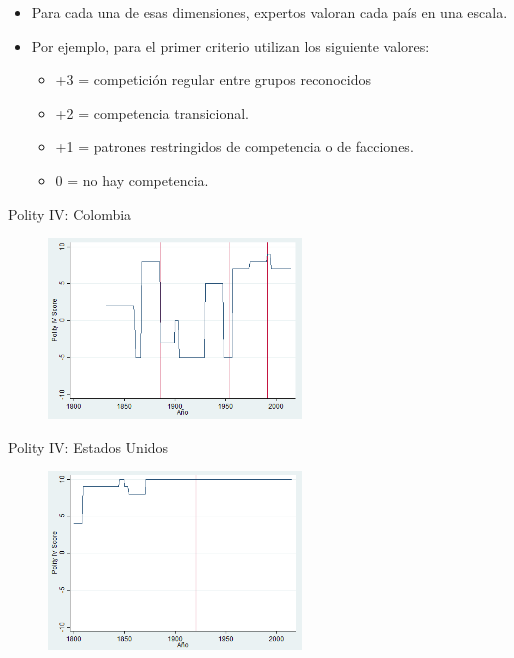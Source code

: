 \documentclass[xcolor=dvipsnames]{beamer}
\begin{document}
\begin{frame}
\begin{itemize}
\justifying
\item Para cada una de esas dimensiones, expertos valoran cada país en una escala.
\item Por ejemplo, para el primer criterio utilizan los siguiente valores: \begin{itemize}
\item +3 = competición regular entre grupos reconocidos
\item +2 = competencia transicional.
\item +1 = patrones restringidos de competencia o de facciones.
\item 0 = no hay competencia.
\end{itemize}
\end{itemize}
\end{frame}

\begin{frame}{Polity IV: Colombia}
\begin{figure}[H]
	\centering  
	\caption{ } 
	\includegraphics[width = 0.6\textwidth]{./cap1}
\end{figure}
\end{frame}

\begin{frame}{Polity IV: Estados Unidos}
	\begin{figure}[H]
		\centering  
		\caption{ } 
		\includegraphics[width = 0.6\textwidth]{./cap2}
	\end{figure}
\end{frame}
\end{document}
